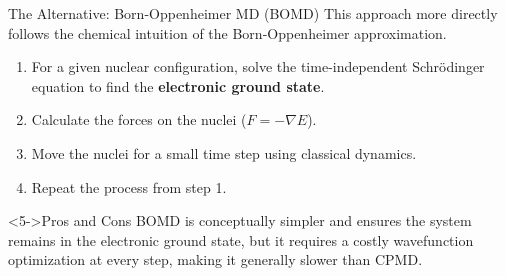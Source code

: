 
\begin{frame}{The Alternative: Born-Oppenheimer MD (BOMD)}
    This approach more directly follows the chemical intuition of the Born-Oppenheimer approximation.
    \pause
    \begin{enumerate}
        \item For a given nuclear configuration, solve the time-independent Schrödinger equation to find the \textbf{electronic ground state}.
        \pause
        \item Calculate the forces on the nuclei ($F = -\nabla E$).
        \pause
        \item Move the nuclei for a small time step using classical dynamics.
        \pause
        \item Repeat the process from step 1.
    \end{enumerate}
    \pause
    
    \begin{alertblock}<5->{Pros and Cons}
        BOMD is conceptually simpler and ensures the system remains in the electronic ground state, but it requires a costly wavefunction optimization at every step, making it generally slower than CPMD.
    \end{alertblock}
\end{frame}

